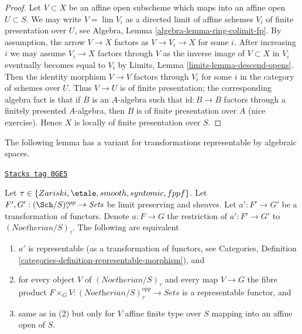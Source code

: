 \begin{proof}
Let $V \subset X$ be an affine open subscheme which maps into an affine
open $U \subset S$. We may write $V = \lim V_i$ as a directed limit of affine
schemes $V_i$ of finite presentation over $U$, see
Algebra, Lemma \ref{algebra-lemma-ring-colimit-fp}.
By assumption, the arrow $V \to X$ factors as $V \to V_i \to X$
for some $i$. After increasing $i$ we may assume $V_i \to X$
factors through $V$ as the inverse image of $V \subset X$ in $V_i$
eventually becomes equal to $V_i$ by
Limits, Lemma \ref{limits-lemma-descend-opens}.
Then the identity morphism $V \to V$ factors through $V_i$ for some $i$
in the category of schemes over $U$. Thus $V \to U$ is of finite presentation;
the corresponding algebra fact is that if $B$ is an $A$-algebra
such that $\text{id} : B \to B$ factors through a finitely presented
$A$-algebra, then $B$ is of finite presentation over $A$ (nice exercise).
Hence $X$ is locally of finite presentation over $S$.
\end{proof}

The following lemma has a variant for transformations
representable by algebraic spaces.

\begin{lemma}[Representable]
\label{artin-lemma-representable}
\href{https://stacks.math.columbia.edu/tag/0GE5}{\texttt{Stacks tag 0GE5}}

Let $\tau \in \{Zariski, \etale, smooth, syntomic, fppf\}$.
Let $F', G' : (\Sch/S)_\tau^{opp} \to \textit{Sets}$ be limit preserving
and sheaves. Let $a' : F' \to G'$ be a transformation of functors.
Denote $a : F \to G$ the restriction of $a' : F' \to G'$ to
$(\textit{Noetherian}/S)_\tau$. The following are equivalent
\begin{enumerate}
\item $a'$ is representable (as a transformation of functors, see
Categories, Definition \ref{categories-definition-representable-morphism}), and
\item for every object $V$ of $(\textit{Noetherian}/S)_\tau$
and every map $V \to G$ the fibre product
$F \times_G V : (\textit{Noetherian}/S)_\tau^{opp} \to \textit{Sets}$
is a representable functor, and
\item same as in (2) but only for $V$ affine finite type over $S$
mapping into an affine open of $S$.
\end{enumerate}
\end{lemma}

